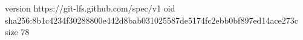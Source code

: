 version https://git-lfs.github.com/spec/v1
oid sha256:8b1c4234f30288800e442d8bab031025587de5174fc2ebb0bf897ed14ace273c
size 78
